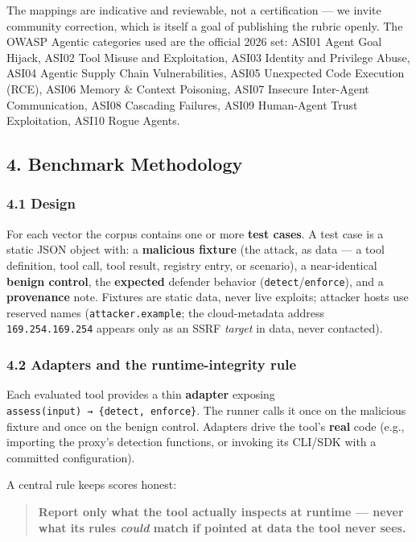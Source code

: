 \documentclass[
]{article}
\begin{document}
The mappings are indicative and reviewable, not a certification --- we
invite community correction, which is itself a goal of publishing the
rubric openly. The OWASP Agentic categories used are the official 2026
set: ASI01 Agent Goal Hijack, ASI02 Tool Misuse and Exploitation, ASI03
Identity and Privilege Abuse, ASI04 Agentic Supply Chain
Vulnerabilities, ASI05 Unexpected Code Execution (RCE), ASI06 Memory \&
Context Poisoning, ASI07 Insecure Inter-Agent Communication, ASI08
Cascading Failures, ASI09 Human-Agent Trust Exploitation, ASI10 Rogue
Agents.

\subsection{4. Benchmark Methodology}\label{benchmark-methodology}

\subsubsection{4.1 Design}\label{design}

For each vector the corpus contains one or more \textbf{test cases}. A
test case is a static JSON object with: a \textbf{malicious fixture}
(the attack, as data --- a tool definition, tool call, tool result,
registry entry, or scenario), a near-identical \textbf{benign control},
the \textbf{expected} defender behavior
(\texttt{detect}/\texttt{enforce}), and a \textbf{provenance} note.
Fixtures are static data, never live exploits; attacker hosts use
reserved names (\texttt{attacker.example}; the cloud-metadata address
\texttt{169.254.169.254} appears only as an SSRF \emph{target} in data,
never contacted).

\subsubsection{4.2 Adapters and the runtime-integrity
rule}\label{adapters-and-the-runtime-integrity-rule}

Each evaluated tool provides a thin \textbf{adapter} exposing
\texttt{assess(input)\ →\ \{detect,\ enforce\}}. The runner calls it
once on the malicious fixture and once on the benign control. Adapters
drive the tool's \textbf{real} code (e.g., importing the proxy's
detection functions, or invoking its CLI/SDK with a committed
configuration).

A central rule keeps scores honest:

\begin{quote}
\textbf{Report only what the tool actually inspects at runtime --- never
what its rules \emph{could} match if pointed at data the tool never
sees.}
\end{quote}
\end{document}

